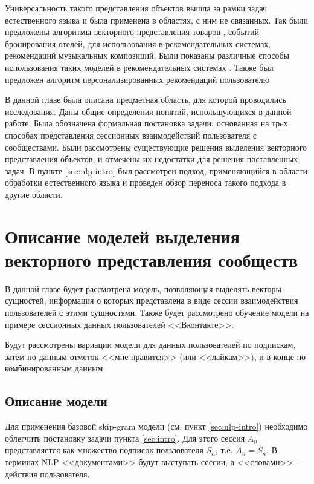 \documentclass[times,specification,annotation]{itmo-student-thesis}
\begin{document}
Универсальность такого представления объектов вышла за рамки задач естественного языка и была применена в областях, с ним не связанных. Так были предложены алгоритмы векторного представления товаров \cite{grbovic2015commerce}\cite{Vasile2016}, событий бронирования отелей\cite{airbnb}, для использования в рекомендательных системах, рекомендаций музыкальных композиций\cite{cheng2017exploiting}. Были показаны различные способы использования таких моделей в рекомендательных системах \cite{ozsoy2016word}. Также был предложен алгоритм персонализированных рекомендаций пользователю \cite{manotumruksa2016modelling}

\chapterconclusion

В данной главе была описана предметная область, для которой проводились исследования. Даны общие определения понятий, испольщующихся в данной работе. Была обозначена формальная постановка задачи, основанная на трeх способах представления сессионных взаимодействий пользователя с сообществами. Были рассмотрены существующие решения выделения векторного представления объектов, и отмечены их недостатки для решения поставленных задач. В пункте \ref{sec:nlp-intro} был рассмотрен подход, применяющийся в области обработки естественного языка и проведeн обзор переноса такого подхода в другие области.   

\finishrelatedwork

\chapter{Описание моделей выделения векторного представления сообществ}

В данной главе будет рассмотрена модель, позволяющая выделять векторы
сущностей, информация о которых представлена в виде сессии взаимодействия
пользователей с этими сущностями.
Также будет рассмотрено обучение модели на примере сессионных данных пользователей <<Вконтакте>>. 

Будут рассмотрены вариации модели для данных пользователей по подпискам, затем по данным отметок <<мне нравится>> (или <<лайкам>>), и в конце по комбинированным данным.

\section{Описание модели}\label{sec:algo}

Для применения базовой skip-gram \cite{mikolov2013distributed} модели (см. пункт \ref{sec:nlp-intro}) необходимо облегчить постановку задачи пункта \ref{sec:intro}. Для этого сессия $A_n$ представляется как множество подписок пользователя $S_n$, т.е. $A_n = S_n$. В терминах NLP <<документами>> будут выступать сессии, а <<словами>> --- действия пользователя.
\end{document}
